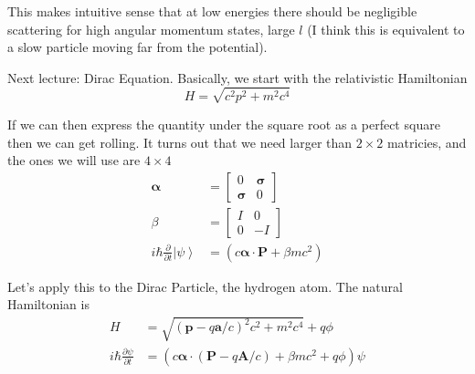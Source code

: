 \documentclass[10pt]{report}
\newcommand{\ket}[1]{\left|#1\right>}
\newcommand{\pd}[2]{\frac{\partial #1}{\partial#2}}
\begin{document}
This makes intuitive sense that at low energies there should be negligible scattering for high angular momentum states, large $l$ (I think this is equivalent to a slow particle moving far from the potential). 

Next lecture: Dirac Equation. Basically, we start with the relativistic Hamiltonian
\begin{equation}
    H = \sqrt{c^2p^2 + m^2c^4}
\end{equation}

If we can then express the quantity under the square root as a perfect square then we can get rolling. It turns out that we need larger than $2\times2$ matricies, and the ones we will use are $4\times4$
\begin{align}
    \mathbf{\alpha} &= \begin{bmatrix} 0 & \mathbf{\sigma} \\ \mathbf{\sigma} & 0 \end{bmatrix} \\
    \beta &= \begin{bmatrix} I &0 \\ 0 & -I \end{bmatrix} \\
    i\hbar\pd{}{t}\ket{\psi} &= \left( c\mathbf{\alpha}\cdot \mathbf{P} + \beta mc^2 \right)
\end{align}

Let's apply this to the Dirac Particle, the hydrogen atom. The natural Hamiltonian is
\begin{align}
    H &= \sqrt{\left( \mathbf{p} - q\mathbf{a}/c \right)^2c^2 + m^2c^4} + q\phi\\
    i\hbar\pd{\psi}{t} &= \left( c\mathbf{\alpha}\cdot\left( \mathbf{P} - q\mathbf{A}/c \right) + \beta mc^2 + q\phi \right)\psi
\end{align}
\end{document}
